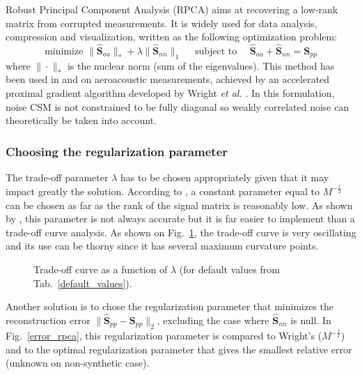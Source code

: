 \documentclass[fontsize=12pt,DIV13,paper=a4,abstract=true,titlepage=false]{scrartcl}
\begin{document}
Robust Principal Component Analysis (RPCA) aims at recovering a low-rank matrix from corrupted measurements. It  is widely used for data analysis, compression and visualization, written as the following optimization problem: 
\begin{equation}
	\text{minimize~} \|\bm{\hat{S}}_{aa} \|_* + \lambda \| \bm{\hat{S}}_{nn} \|_1  \text{~~~~subject to~~~~}  \bm{\hat{S}}_{aa} +  \bm{\hat{S}}_{nn} = \bm{S}_{pp}
	\label{rpca}
\end{equation}
where $\|\cdot\|_*$ is the nuclear norm (sum of the eigenvalues).
This method has been used in \cite{finez:hal-01276687} and  \cite{Amailland2017phd} on aeroacoustic measurements, achieved by an accelerated proximal gradient algorithm developed by Wright \textit{et al.} \cite{Wright2009}.  In this formulation, noise CSM is not constrained to be fully diagonal so weakly correlated noise can theoretically be taken into account.

\subsubsection{Choosing the regularization parameter}
The trade-off parameter $\lambda$ has to be chosen appropriately given that it may impact greatly the solution. According to \cite{Wright2009,Candes2011}, a constant parameter equal to $M^{-\frac{1}{2}}$ can be chosen as far as the rank of the signal matrix is reasonably low. As shown by \cite{Amailland2017phd}, this parameter is not always accurate but it is far easier to implement than a trade-off curve analysis. As shown on Fig.~\ref{l-curve}, the trade-off curve  is very oscillating and its use can be thorny since it has several maximum curvature points.

\begin{figure}[H]
	\centering
	
	\caption{Trade-off curve as a function of $\lambda$ (for default values from Tab.~\ref{default_values}). \label{l-curve}}
\end{figure}

Another solution is to chose the regularization parameter that minimizes the reconstruction error $\| \bm{\hat{S}}_{pp}-\bm{S}_{pp}\|_2$, excluding the case where $\bm{\hat{S}}_{nn}$ is null. In Fig.~\ref{error_rpca}, this regularization parameter is compared to Wright's ($M^{-\frac{1}{2}}$) and to the optimal regularization parameter that gives the smallest relative error (unknown on non-synthetic case).
\end{document}
